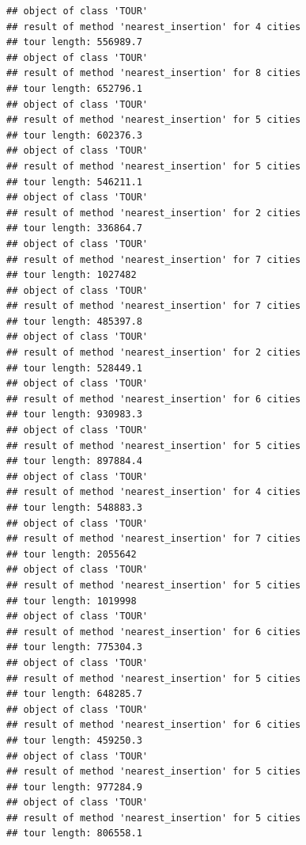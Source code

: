 \documentclass[
]{article}
\newenvironment{Shaded}{\begin{snugshade}}{\end{snugshade}}
\newcommand{\CommentTok}[1]{\textcolor[rgb]{0.56,0.35,0.01}{\textit{#1}}}
\newcommand{\FunctionTok}[1]{\textcolor[rgb]{0.13,0.29,0.53}{\textbf{#1}}}
\newcommand{\NormalTok}[1]{#1}
\newcommand{\OtherTok}[1]{\textcolor[rgb]{0.56,0.35,0.01}{#1}}
\newcommand{\SpecialCharTok}[1]{\textcolor[rgb]{0.81,0.36,0.00}{\textbf{#1}}}
\newcommand{\StringTok}[1]{\textcolor[rgb]{0.31,0.60,0.02}{#1}}
\begin{document}
\begin{Shaded}
\end{Shaded}

\begin{verbatim}
## object of class 'TOUR' 
## result of method 'nearest_insertion' for 4 cities
## tour length: 556989.7 
## object of class 'TOUR' 
## result of method 'nearest_insertion' for 8 cities
## tour length: 652796.1 
## object of class 'TOUR' 
## result of method 'nearest_insertion' for 5 cities
## tour length: 602376.3 
## object of class 'TOUR' 
## result of method 'nearest_insertion' for 5 cities
## tour length: 546211.1 
## object of class 'TOUR' 
## result of method 'nearest_insertion' for 2 cities
## tour length: 336864.7 
## object of class 'TOUR' 
## result of method 'nearest_insertion' for 7 cities
## tour length: 1027482 
## object of class 'TOUR' 
## result of method 'nearest_insertion' for 7 cities
## tour length: 485397.8 
## object of class 'TOUR' 
## result of method 'nearest_insertion' for 2 cities
## tour length: 528449.1 
## object of class 'TOUR' 
## result of method 'nearest_insertion' for 6 cities
## tour length: 930983.3 
## object of class 'TOUR' 
## result of method 'nearest_insertion' for 5 cities
## tour length: 897884.4 
## object of class 'TOUR' 
## result of method 'nearest_insertion' for 4 cities
## tour length: 548883.3 
## object of class 'TOUR' 
## result of method 'nearest_insertion' for 7 cities
## tour length: 2055642 
## object of class 'TOUR' 
## result of method 'nearest_insertion' for 5 cities
## tour length: 1019998 
## object of class 'TOUR' 
## result of method 'nearest_insertion' for 6 cities
## tour length: 775304.3 
## object of class 'TOUR' 
## result of method 'nearest_insertion' for 5 cities
## tour length: 648285.7 
## object of class 'TOUR' 
## result of method 'nearest_insertion' for 6 cities
## tour length: 459250.3 
## object of class 'TOUR' 
## result of method 'nearest_insertion' for 5 cities
## tour length: 977284.9 
## object of class 'TOUR' 
## result of method 'nearest_insertion' for 5 cities
## tour length: 806558.1
\end{verbatim}
\end{document}
